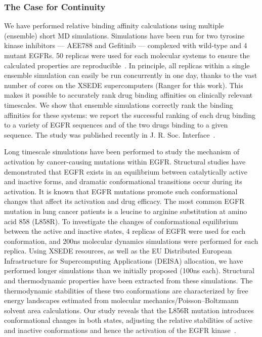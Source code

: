 \documentclass[a4paper,11pt]{article}
\begin{document}
\subsubsection{The Case for Continuity}
We have performed relative binding affinity calculations using multiple (ensemble) short MD 
simulations. Simulations have been run for two tyrosine kinase inhibitors — AEE788 and Gefitinib — 
complexed with wild-type and 4 mutant EGFRs. 50 replicas were used for each molecular systems to 
ensure the calculated properties are reproducible~\cite{Ref6}. In principle, all replicas within a single 
ensemble simulation can easily be run concurrently in one day, thanks to the vast number of cores 
on the XSEDE supercomputers (Ranger for this work). This makes it possible to accurately rank 
drug binding affinities on clinically relevant timescales. We show that ensemble simulations 
correctly rank the binding affinities for these systems: we report the successful ranking of each 
drug binding to a variety of EGFR sequences and of the two drugs binding to a given sequence. The 
study was published recently in J. R. Soc. Interface~\cite{Ref6}.

Long timescale simulations have been performed to study the mechanism of activation by 
cancer-causing mutations within EGFR. Structural studies have demonstrated that EGFR exists in an 
equilibrium between catalytically active and inactive forms, and dramatic conformational 
transitions occur during its activation. It is known that EGFR mutations promote such conformational 
changes that affect its activation and drug efficacy. The most common EGFR mutation in lung cancer 
patients is a leucine to arginine substitution at amino acid 858 (L858R). To investigate the changes 
of conformational equilibrium between the active and inactive states, 4 replicas of EGFR were used 
for each conformation, and 200ns molecular dynamics simulations were performed for each replica. 
Using XSEDE resources, as well as the EU Distributed European Infrastructure for Supercomputing 
Applications (DEISA) allocation, we have performed longer simulations than we initially proposed 
(100ns each). Structural and thermodynamic properties have been extracted from these simulations. 
The thermodynamic stabilities of these two conformations are characterized by free energy landscapes 
estimated from molecular mechanics/Poisson–Boltzmann solvent area calculations. Our study reveals 
that the L856R mutation introduces conformational changes in both states, adjusting the relative 
stabilities of active and inactive conformations and hence the activation of the EGFR kinase~\cite{Ref7}.
\end{document}
